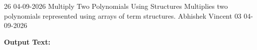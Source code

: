 \clearpage
\label{prog:26}
\programhead
  {26}
  {04-09-2026}
  {Multiply Two Polynomials Using Structures}
  {Multiplies two polynomials represented using arrays of term structures.}
  {Abhishek Vincent}
  {03}
  {04-09-2026}

\divider
\textbf{Output Text:}\par
\vspace{2pt}

